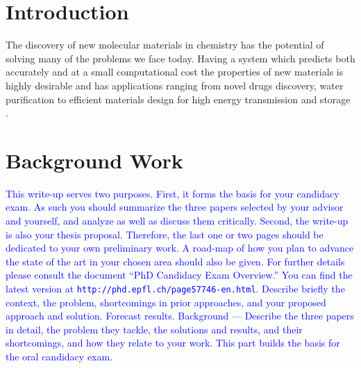 \documentclass[10pt,journal,a4paper]{IEEEtran}
\begin{document}
\IEEEpeerreviewmaketitle


\section{Introduction}

The discovery of new molecular materials in chemistry has the potential of solving many of the problems we face today.
Having a system which predicts both accurately and at a small computational cost the properties of new materials is highly desirable and has applications ranging from novel drugs discovery, water purification to efficient materials design for high energy transmission and storage \cite{cleanenergy}.
 
\section{Background Work}
\textcolor{blue}{This write-up serves two purposes. First, it forms the basis for
your candidacy exam. As such you should summarize the three papers selected
by your advisor and yourself, and analyze as well as discuss them critically.
Second, the write-up 
is also your thesis proposal.  Therefore, the last one or two pages should
be dedicated to your own preliminary work. A road-map of how you plan to
advance the state of the art in your chosen area should also be given.
For further details please consult the document ``PhD Candidacy Exam Overview.'' You can find the latest
version at {\tt http://phd.epfl.ch/page57746-en.html}.
Describe briefly the context, the problem, shortcomings in prior
approaches, and your proposed approach and solution. Forecast results.
Background --- Describe the three papers in detail, the problem they
tackle, the solutions and results, and their shortcomings, and how they
relate to your work.  This part builds the basis for the oral candidacy exam.}


%
%
\end{document}
